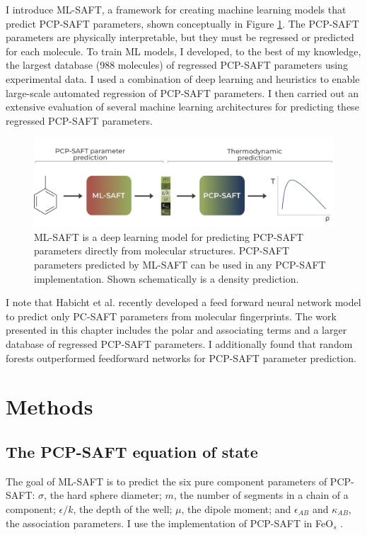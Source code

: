I introduce ML-SAFT, a framework for creating machine learning models that predict PCP-SAFT parameters, shown conceptually in Figure \ref{fig:ML-SAFT_workflow}. The PCP-SAFT parameters are physically interpretable, but they must be regressed or predicted for each molecule.  To train ML models, I developed, to the best of my knowledge, the largest database (988 molecules) of regressed PCP-SAFT parameters using experimental data. I used a combination of deep learning and heuristics to enable large-scale automated regression of PCP-SAFT parameters. I then carried out an extensive evaluation of several machine learning architectures for predicting these regressed PCP-SAFT parameters.

\begin{figure}
    \centering
    \includegraphics[width=\textwidth]{gfx/Chapter08/mlsaft_workflow.png}
    \caption{ML-SAFT is a deep learning model for predicting PCP-SAFT parameters directly from molecular structures. PCP-SAFT parameters predicted by ML-SAFT can be used in any PCP-SAFT implementation. Shown schematically is a density prediction.}
    \label{fig:ML-SAFT_workflow}
\end{figure}

I note that Habicht et al. \cite{Habicht2023} recently developed a feed forward neural network model to predict only PC-SAFT parameters from molecular fingerprints. The work presented in this chapter includes the polar and associating terms and a larger database of regressed PCP-SAFT parameters. I additionally found that random forests outperformed feedforward networks for PCP-SAFT parameter prediction.


\section{Methods}
\label{sec:methods}

\subsection{The PCP-SAFT equation of state}

The goal of ML-SAFT is to predict the six pure component parameters of PCP-SAFT: $\sigma$, the hard sphere diameter; $m$, the number of segments in a chain of a component; $\epsilon/k$, the depth of the well; $\mu$, the dipole moment; and $\epsilon_{AB}$ and $\kappa_{AB}$, the association parameters. I use the implementation of PCP-SAFT in FeO$_{s}$ \cite{Rehner2023}.

